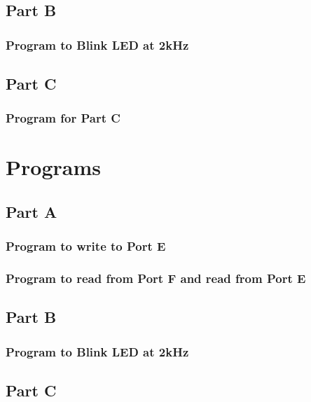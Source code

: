 \documentclass[letterpaper, 12pt]{article}
\begin{document}
\subsection*{Part B}
\subsubsection*{Program to Blink LED at 2kHz}

\subsection*{Part C}
\subsubsection*{Program for Part C}

\section*{Programs}
\subsection*{Part A}
\subsubsection*{Program to write to Port E}

\subsubsection*{Program to read from Port F and read from Port E}

\subsection*{Part B}
\subsubsection*{Program to Blink LED at 2kHz}

\subsection*{Part C}

\end{document}
